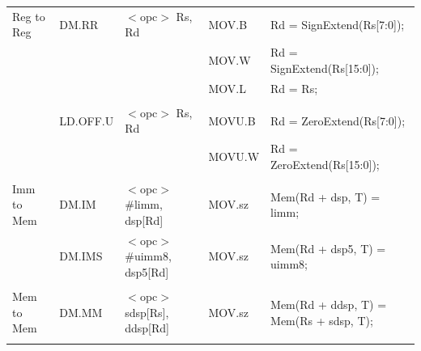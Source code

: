 \begin{table}
\begin{center}
\begin{tabular}{lllll}
Reg to Reg         & DM.RR             & $<$opc$>$ Rs, Rd                      & MOV.B             & Rd = SignExtend(Rs[7:0]);                                                     \\
                   &                   &                                       & MOV.W             & Rd = SignExtend(Rs[15:0]);                                                    \\
                   &                   &                                       & MOV.L             & Rd = Rs;                                                                      \\
                   &                   &                                       &                   &                                                                               \\
                   & LD.OFF.U          & $<$opc$>$ Rs, Rd                      & MOVU.B            & Rd = ZeroExtend(Rs[7:0]);                                                     \\
                   &                   &                                       & MOVU.W            & Rd = ZeroExtend(Rs[15:0]);                                                    \\
                   &                   &                                       &                   &                                                                               \\
Imm to Mem         & DM.IM             & $<$opc$>$ \#limm, dsp[Rd]             & MOV.sz            & Mem(Rd + dsp, T) = limm;                                                      \\
                   & DM.IMS            & $<$opc$>$ \#uimm8, dsp5[Rd]           & MOV.sz            & Mem(Rd + dsp5, T) = uimm8;                                                    \\
                   &                   &                                       &                   &                                                                               \\
Mem to Mem         & DM.MM             & $<$opc$>$ sdsp[Rs], ddsp[Rd]          & MOV.sz            & Mem(Rd + ddsp, T) = Mem(Rs + sdsp, T);                                        \\
                   &                   &                                       &                   &                                                                               \\

\end{tabular}
\end{center}
\end{table}
